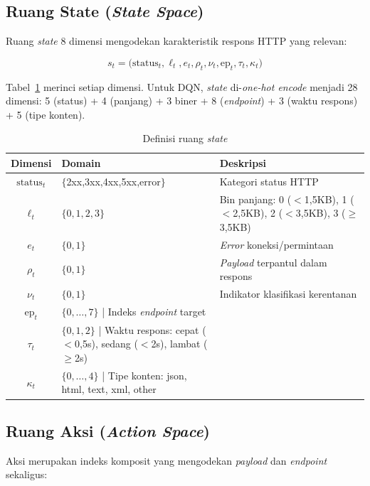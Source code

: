 \documentclass[a4paper,12pt]{article}
\begin{document}
\subsection{Ruang State (\textit{State Space})}

Ruang \textit{state} 8 dimensi mengodekan karakteristik respons HTTP yang relevan:

\begin{equation}\label{eq:state}
s_t = \bigl(\text{status}_t, \ell_t, e_t, \rho_t, \nu_t, \text{ep}_t, \tau_t, \kappa_t\bigr)
\end{equation}

Tabel~\ref{tab:state} merinci setiap dimensi. Untuk DQN, \textit{state} di-\textit{one-hot encode} menjadi 28 dimensi: 5 (status) + 4 (panjang) + 3 biner + 8 (\textit{endpoint}) + 3 (waktu respons) + 5 (tipe konten).

\begin{table}[H]
\caption{Definisi ruang \textit{state}}
\centering
\label{tab:state}
\small
\begin{tabular}{clp{7cm}}
\toprule
Dimensi & Domain & Deskripsi \\
\midrule
$\text{status}_t$ & $\{$2xx,3xx,4xx,5xx,error$\}$ & Kategori status HTTP \\
$\ell_t$ & $\{0,1,2,3\}$ & Bin panjang: 0 ($<$1,5KB), 1 ($<$2,5KB), 2 ($<$3,5KB), 3 ($\ge$3,5KB) \\
$e_t$ & $\{0,1\}$ & \textit{Error} koneksi/permintaan \\
$\rho_t$ & $\{0,1\}$ & \textit{Payload} terpantul dalam respons \\
$\nu_t$ & $\{0,1\}$ & Indikator klasifikasi kerentanan \\
$\text{ep}_t$ & $\{0,\dots,7\}$ | Indeks \textit{endpoint} target \\
$\tau_t$ & $\{0,1,2\}$ | Waktu respons: cepat ($<$0,5s), sedang ($<$2s), lambat ($\ge$2s) \\
$\kappa_t$ & $\{0,\dots,4\}$ | Tipe konten: json, html, text, xml, other \\
\bottomrule
\end{tabular}
\end{table}

\subsection{Ruang Aksi (\textit{Action Space})}

Aksi merupakan indeks komposit yang mengodekan \textit{payload} dan \textit{endpoint} sekaligus:
\end{document}
